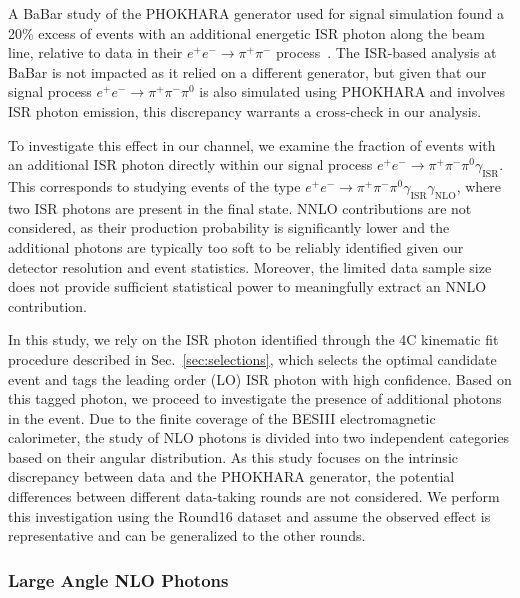 A BaBar study of the PHOKHARA generator used for signal simulation found a 20\% excess of events with an additional energetic ISR photon along the beam line, relative to data in their \( e^+e^- \to \pi^+\pi^- \) process~\cite{PhysRevD.108.L111103}. The ISR-based analysis at BaBar is not impacted as it relied on a different generator, but given that our signal process \( e^+e^- \to \pi^+\pi^-\pi^0 \) is also simulated using PHOKHARA and involves ISR photon emission, this discrepancy warrants a cross-check in our analysis.

To investigate this effect in our channel, we examine the fraction of events with an additional ISR photon directly within our signal process \( e^+e^- \to \pi^+\pi^-\pi^0\gamma_{\text{ISR}} \). This corresponds to studying events of the type \( e^+e^- \to \pi^+\pi^-\pi^0\gamma_{\text{ISR}}\gamma_{\text{NLO}} \), where two ISR photons are present in the final state. NNLO contributions are not considered, as their production probability is significantly lower and the additional photons are typically too soft to be reliably identified given our detector resolution and event statistics. Moreover, the limited data sample size does not provide sufficient statistical power to meaningfully extract an NNLO contribution.

In this study, we rely on the ISR photon identified through the 4C kinematic fit procedure described in Sec.~\ref{sec:selections}, which selects the optimal candidate event and tags the leading order (LO) ISR photon with high confidence. Based on this tagged photon, we proceed to investigate the presence of additional photons in the event. Due to the finite coverage of the BESIII electromagnetic calorimeter, the study of NLO photons is divided into two independent categories based on their angular distribution. As this study focuses on the intrinsic discrepancy between data and the PHOKHARA generator, the potential differences between different data-taking rounds are not considered. We perform this investigation using the Round16 dataset and assume the observed effect is representative and can be generalized to the other rounds.

\subsubsection{Large Angle NLO Photons}
\label{sec:nlo_la}

